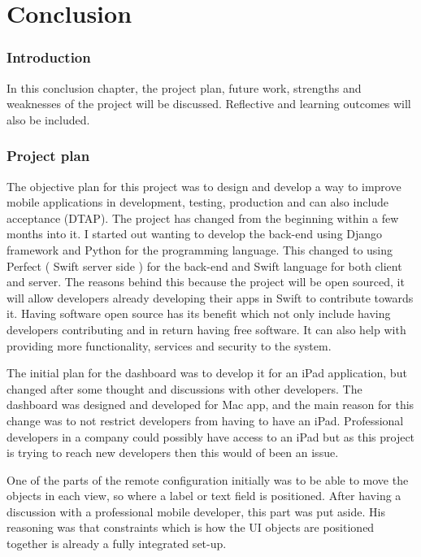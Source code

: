 \chapter{Conclusion}

\label{ch:conclusions}

\subsection{Introduction}

In this conclusion chapter, the project plan, future work, strengths and weaknesses of the project will be discussed. Reflective and learning outcomes will also be included.

\subsection{Project plan}

The objective plan for this project was to design and develop a way to improve mobile applications in development, testing, production and can also include acceptance (DTAP). The project has changed from the beginning within a few months into it. I started out wanting to develop the back-end using Django framework and Python for the programming language. This changed to using Perfect ( Swift server side ) for the back-end and Swift language for both client and server. The reasons behind this because the project will be open sourced, it will allow developers already developing their apps in Swift to contribute towards it. Having software open source has its benefit which not only include having developers contributing and in return having free software. It can also help with providing more functionality, services and security to the system.

The initial plan for the dashboard was to develop it for an iPad application, but changed after some thought and discussions with other developers. The dashboard was designed and developed for Mac app, and the main reason for this change was to not restrict developers from having to have an iPad. Professional developers in a company could possibly have access to an iPad but as this project is trying to reach new developers then this would of been an issue.

One of the parts of the remote configuration initially was to be able to move the objects in each view, so where a label or text field is positioned. After having a discussion with a professional mobile developer, this part was put aside. His reasoning was that constraints which is how the UI objects are positioned together is already a fully integrated set-up.

